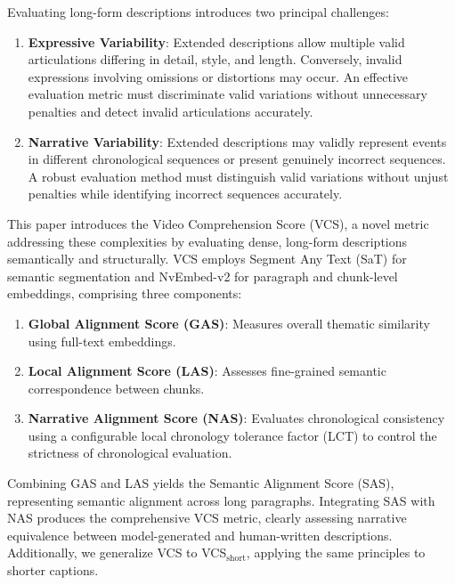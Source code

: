 \documentclass[letterpaper]{article} %
\begin{document}
Evaluating long-form descriptions introduces two principal challenges:
\begin{enumerate}
\item \textbf{Expressive Variability}: Extended descriptions allow multiple valid articulations differing in detail, style, and length. Conversely, invalid expressions involving omissions or distortions may occur. An effective evaluation metric must discriminate valid variations without unnecessary penalties and detect invalid articulations accurately.
\item \textbf{Narrative Variability}: Extended descriptions may validly represent events in different chronological sequences or present genuinely incorrect sequences. A robust evaluation method must distinguish valid variations without unjust penalties while identifying incorrect sequences accurately.
\end{enumerate}

This paper introduces the Video Comprehension Score (VCS), a novel metric addressing these complexities by evaluating dense, long-form descriptions semantically and structurally. VCS employs Segment Any Text (SaT) for semantic segmentation and NvEmbed-v2 for paragraph and chunk-level embeddings, comprising three components:
\begin{enumerate}
\item \textbf{Global Alignment Score (GAS)}: Measures overall thematic similarity using full-text embeddings.
\item \textbf{Local Alignment Score (LAS)}: Assesses fine-grained semantic correspondence between chunks.
\item \textbf{Narrative Alignment Score (NAS)}: Evaluates chronological consistency using a configurable local chronology tolerance factor (LCT) to control the strictness of chronological evaluation.
\end{enumerate}

Combining GAS and LAS yields the Semantic Alignment Score (SAS), representing semantic alignment across long paragraphs. Integrating SAS with NAS produces the comprehensive VCS metric, clearly assessing narrative equivalence between model-generated and human-written descriptions. Additionally, we generalize VCS to VCS$_{\text{short}}$, applying the same principles to shorter captions.
\end{document}
